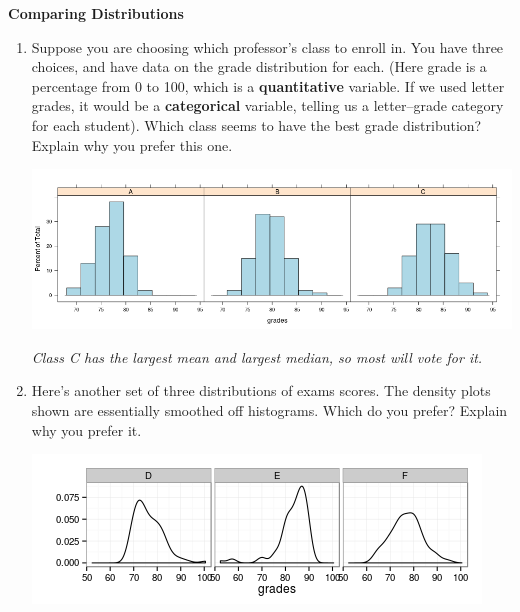 \def\theTopic{ Comparing Distributions }
\def\dayNum{10 }

\begin{center}
{\bf {\large Comparing Distributions}}
\end{center}

\begin{enumerate}
   \item  Suppose you are choosing which professor's class to enroll
     in.  You have three choices, and have data on the grade
     distribution for each. (Here grade is a percentage from 0 to 100,
     which is a {\bf quantitative} variable.  If we used letter
     grades, it would be a {\bf categorical} variable, telling us
     a letter--grade category for each student). Which class seems to
     have the best grade distribution? Explain why you prefer this one. 

    \includegraphics[width=.9\linewidth]{plots/3classGradeCompareMn.png}
\begin{students}
    \vspace{3cm}    
\end{students}

\begin{key}
  {\it Class C has the largest mean and largest median, so most will vote for it. }
\end{key}

\item  Here's another set of three distributions of exams scores.
     The density plots shown are essentially smoothed off histograms.
     Which do you prefer?  Explain why you prefer it. 

   \includegraphics[width=.9\linewidth]{plots/3classGradeCompareSkw.png}
\begin{students}
    \vspace{5cm}    
\end{students}


\end{enumerate}
